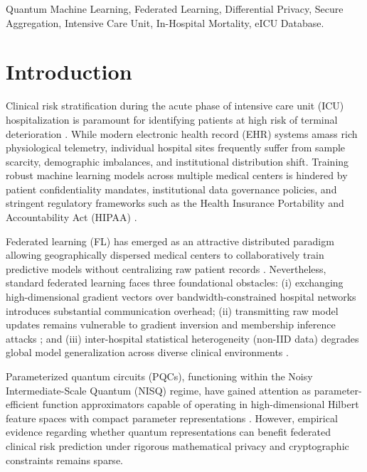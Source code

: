 \documentclass[conference]{IEEEtran}
\begin{document}
\begin{IEEEkeywords}
Quantum Machine Learning, Federated Learning, Differential Privacy, Secure Aggregation, Intensive Care Unit, In-Hospital Mortality, eICU Database.
\end{IEEEkeywords}

\section{Introduction}
Clinical risk stratification during the acute phase of intensive care unit (ICU) hospitalization is paramount for identifying patients at high risk of terminal deterioration \cite{zimmerman2006acute, rajpurkar2022ai}. While modern electronic health record (EHR) systems amass rich physiological telemetry, individual hospital sites frequently suffer from sample scarcity, demographic imbalances, and institutional distribution shift. Training robust machine learning models across multiple medical centers is hindered by patient confidentiality mandates, institutional data governance policies, and stringent regulatory frameworks such as the Health Insurance Portability and Accountability Act (HIPAA) \cite{rieke2020future, kairouz2021advances}.

Federated learning (FL) has emerged as an attractive distributed paradigm allowing geographically dispersed medical centers to collaboratively train predictive models without centralizing raw patient records \cite{mcmahan2017communication}. Nevertheless, standard federated learning faces three foundational obstacles: (i) exchanging high-dimensional gradient vectors over bandwidth-constrained hospital networks introduces substantial communication overhead; (ii) transmitting raw model updates remains vulnerable to gradient inversion and membership inference attacks \cite{shokri2017membership}; and (iii) inter-hospital statistical heterogeneity (non-IID data) degrades global model generalization across diverse clinical environments \cite{li2020federated}.

Parameterized quantum circuits (PQCs), functioning within the Noisy Intermediate-Scale Quantum (NISQ) regime, have gained attention as parameter-efficient function approximators capable of operating in high-dimensional Hilbert feature spaces with compact parameter representations \cite{cerezo2021variational, havlicek2019supervised, schuld2020circuit}. However, empirical evidence regarding whether quantum representations can benefit federated clinical risk prediction under rigorous mathematical privacy and cryptographic constraints remains sparse.
\end{document}
